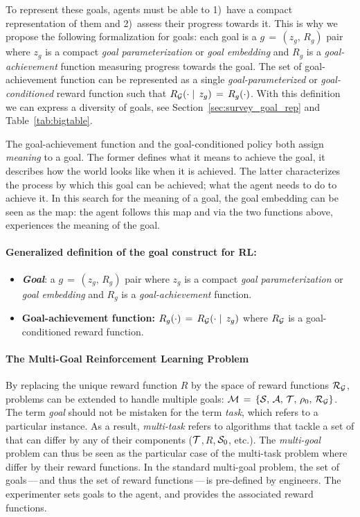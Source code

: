 To represent these goals, \rl agents must be able to 1)~have a compact representation of them and 2)~assess their progress towards it. This is why we propose the following formalization for \rl goals: each goal is a $g\,=\,(z_g,\,R_g)$ pair where $z_g$ is a compact \textit{goal parameterization} or \textit{goal embedding} and $R_g$ is a \textit{goal-achievement} function measuring progress towards the goal. The set of goal-achievement function can be represented as a single \textit{goal-parameterized} or \textit{goal-conditioned} reward function such that $R_{\mathcal{G}}(\cdot\mid\,z_g)\,=\,R_g(\cdot)$. With this definition we can express a diversity of goals, see Section~\ref{sec:survey_goal_rep} and Table~\ref{tab:bigtable}.

The goal-achievement function and the goal-conditioned policy both assign \textit{meaning} to a goal. The former defines what it means to achieve the goal, it describes how the world looks like when it is achieved. The latter characterizes the process by which this goal can be achieved; what the agent needs to do to achieve it. In this search for the meaning of a goal, the goal embedding can be seen as the map: the agent follows this map and via the two functions above, experiences the meaning of the goal.


\begin{tcolorbox}
\small
\paragraph{Generalized definition of the goal construct for RL:}
\begin{itemize}
    \item \textbf{\textit{Goal}}: a $g\,=\,(z_g,\,R_g)$ pair where $z_g$ is a compact \textit{goal parameterization} or \textit{goal embedding} and $R_g$ is a \textit{goal-achievement} function.
    \item \textbf{Goal-achievement function: $R_g(\cdot)\,=\,R_{\mathcal{G}}(\cdot\mid\,z_g)$} where $R_{\mathcal{G}}$ is a goal-conditioned reward function.
\end{itemize}
\end{tcolorbox}

\paragraph{The Multi-Goal Reinforcement Learning Problem}
By replacing the unique reward function $R$ by the space of reward functions $\mathcal{R}_{\mathcal{G}}$, \rl problems can be extended to handle multiple goals: $\mathcal{M}\,=\,\{\mathcal{S},\,\mathcal{A},\,\mathcal{T},\,\rho_0,\,\mathcal{R}_{\mathcal{G}}\}$. The term \textit{goal} should not be mistaken for the term \textit{task}, which refers to a particular \mdp instance. As a result, \textit{multi-task} \rl refers to \rl algorithms that tackle a set of \mdps that can differ by any of their components (\eg $\mathcal{T}$,\,$R$,\,$\mathcal{S}_0$, etc.). The \textit{multi-goal} \rl problem can thus be seen as the particular case of the multi-task \rl problem where \mdps differ by their reward functions. In the standard multi-goal \rl problem, the set of goals\,---\,and thus the set of reward functions\,---\,is pre-defined by engineers. The experimenter sets goals to the agent, and provides the associated reward functions. 

